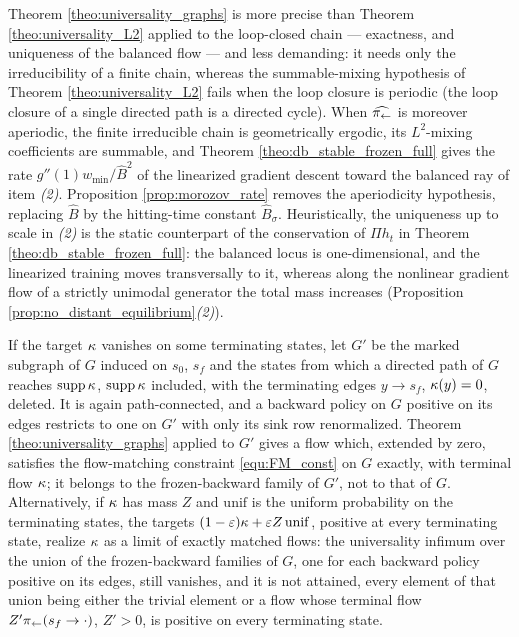 \begin{remark}\label{rem:graphs_vs_L2}
Theorem \ref{theo:universality_graphs} is more precise than Theorem \ref{theo:universality_L2} applied to the loop-closed chain --- exactness, and uniqueness of the balanced flow --- and less demanding: it needs only the irreducibility of a finite chain, whereas the summable-mixing hypothesis of Theorem \ref{theo:universality_L2} fails when the loop closure is periodic (the loop closure of a single directed path is a directed cycle). When $\widehat{\pi_{\leftarrow}}$ is moreover aperiodic, the finite irreducible chain is geometrically ergodic, its $L^2$-mixing coefficients are summable, and Theorem \ref{theo:db_stable_frozen_full} gives the rate $g''(1)w_{\min}/\widehat B^2$ of the linearized gradient descent toward the balanced ray of item \emph{(2)}. Proposition \ref{prop:morozov_rate} removes the aperiodicity hypothesis, replacing $\widehat B$ by the hitting-time constant $\widehat B_\sigma$. Heuristically, the uniqueness up to scale in \emph{(2)} is the static counterpart of the conservation of $\Pi h_t$ in Theorem \ref{theo:db_stable_frozen_full}: the balanced locus is one-dimensional, and the linearized training moves transversally to it, whereas along the nonlinear gradient flow of a strictly unimodal generator the total mass increases (Proposition \ref{prop:no_distant_equilibrium}\emph{(2)}).
\end{remark}

\begin{remark}\label{rem:partial_support}
If the target $\kappa$ vanishes on some terminating states, let $G'$ be the marked subgraph of $G$ induced on $s_0$, $s_f$ and the states from which a directed path of $G$ reaches $\mathrm{supp}\,\kappa$, $\mathrm{supp}\,\kappa$ included, with the terminating edges $y\rightarrow s_f$, $\kappa(y)=0$, deleted. It is again path-connected, and a backward policy on $G$ positive on its edges restricts to one on $G'$ with only its sink row renormalized. Theorem \ref{theo:universality_graphs} applied to $G'$ gives a flow which, extended by zero, satisfies the flow-matching constraint \eqref{equ:FM_const} on $G$ exactly, with terminal flow $\kappa$; it belongs to the frozen-backward family of $G'$, not to that of $G$. Alternatively, if $\kappa$ has mass $Z$ and $\mathrm{unif}$ is the uniform probability on the terminating states, the targets $(1-\varepsilon)\kappa+\varepsilon Z\,\mathrm{unif}$, positive at every terminating state, realize $\kappa$ as a limit of exactly matched flows: the universality infimum over the union of the frozen-backward families of $G$, one for each backward policy positive on its edges, still vanishes, and it is not attained, every element of that union being either the trivial element or a flow whose terminal flow $Z'\pi_{\leftarrow}(s_f\rightarrow\cdot)$, $Z'>0$, is positive on every terminating state.
\end{remark}
